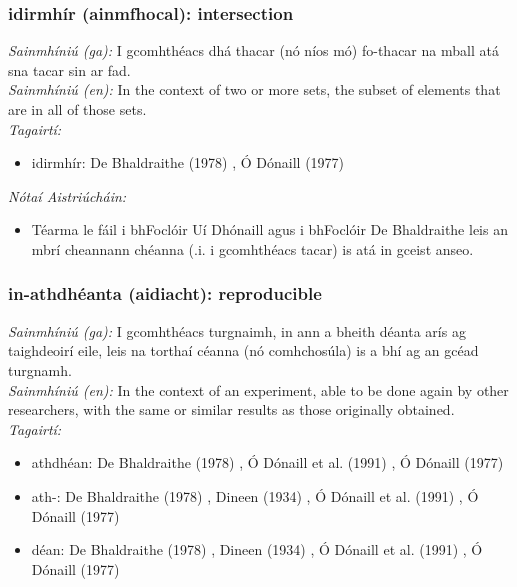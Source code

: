 \subsubsection*{idirmhír (ainmfhocal): intersection}
 \noindent \textit{Sainmhíniú (ga):} I gcomhthéacs dhá thacar (nó níos mó) fo-thacar na mball atá sna tacar sin ar fad.
\\
 \noindent \textit{Sainmhíniú (en):} In the context of two or more sets, the subset of elements that are in all of those sets.
\\
 \noindent \textit{Tagairtí:}
\begin{itemize}
	\item idirmhír: De Bhaldraithe (1978) \cite{de-bhaldraithe}, Ó Dónaill (1977) \cite{odonaill}
\end{itemize}

 \noindent \textit{Nótaí Aistriúcháin:}
\begin{itemize}
	\item Téarma le fáil i bhFoclóir Uí Dhónaill agus i bhFoclóir De Bhaldraithe leis an mbrí cheannann chéanna (.i. i gcomhthéacs tacar) is atá in gceist anseo.
\end{itemize}


\subsubsection*{in-athdhéanta (aidiacht): reproducible}
 \noindent \textit{Sainmhíniú (ga):} I gcomhthéacs turgnaimh, in ann a bheith déanta arís ag taighdeoirí eile, leis na torthaí céanna (nó comhchosúla) is a bhí ag an gcéad turgnamh.
\\
 \noindent \textit{Sainmhíniú (en):} In the context of an experiment, able to be done again by other researchers, with the same or similar results as those originally obtained.
\\
 \noindent \textit{Tagairtí:}
\begin{itemize}
	\item athdhéan: De Bhaldraithe (1978) \cite{de-bhaldraithe}, Ó Dónaill et al. (1991) \cite{focloir-beag}, Ó Dónaill (1977) \cite{odonaill}
	\item ath-: De Bhaldraithe (1978) \cite{de-bhaldraithe}, Dineen (1934) \cite{dineen}, Ó Dónaill et al. (1991) \cite{focloir-beag}, Ó Dónaill (1977) \cite{odonaill}
	\item déan: De Bhaldraithe (1978) \cite{de-bhaldraithe}, Dineen (1934) \cite{dineen}, Ó Dónaill et al. (1991) \cite{focloir-beag}, Ó Dónaill (1977) \cite{odonaill}
\end{itemize}

